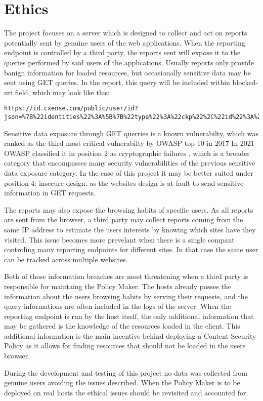 \section{Ethics}
The project focuses on a server which is designed to collect and act on reports potentially sent by genuine users of the web applications. 
When the reporting endpoint is controlled by a third party, the reports sent will expose it to the queries performed by said users of the applications.
Usually reports only provide banign information for loaded resources, but occasionally sensitive data may be sent using GET queries.
In the report, this query will be included within blocked-uri field, which may look like this:
\begin{verbatim}
https://id.cxense.com/public/user/id?json=%7B%22identities%22%3A%5B%7B%22type%22%3A%22ckp%22%2C%22id%22%3A%22lm9kdx9144wtgfya%22%7D%2C%7B%22type%22%3A%22cst%22%2C%22id%22%3A%223dmijrrz7kkn62ie7ib1yw5z6l%22%7D%5D%2C%22siteId%22%3A%221136227972865927410%22%2C%22location%22%3A%22https%3A%2F%2Fwww.libertatea.ro%2F%22%7D&callback=cXJsonpCB2
\end{verbatim}
Sensitive data exposure through GET querries is a known vulnerabilty, which was ranked as the third most critical vulnerabilty by OWASP top 10 in 2017 \cite{owaspTop102017}
In 2021 OWASP classified it in position 2 as cryptographic failures \cite{owaspTop10}, which is a broader category that encompasses many security vulnerabilities of the previous sensitive data exposure category. 
In the case of this project it may be better suited under position 4: insecure design, as the websites design is at fault to send sensitive information in GET requests. 

The reports may also expose the browsing habits of specific users. 
As all reports are sent from the browser, a third party may collect reports coming from the same IP address to estimate the users interests by knowing which sites have they visited. 
This issue becomes more prevelant when there is a single compant controling many reporting endpoints for different sites.
In that case the same user can be tracked across multiple websites.

Both of those information breaches are most threatening when a third party is responsible for maintaing the Policy Maker.
The hosts already posses the information about the users browsing habits by serving their requests, and the query informations are often included in the logs of the server.
When the reporting endpoint is run by the host itself, the only additional information that may be gathered is the knowledge of the resources loaded in the client. 
This additional information is the main incentive behind deploying a Content Security Policy as it allows for finding resources that should not be loaded in the users browser.

During the development and testing of this project no data was collected from genuine users avoiding the issues described.
When the Policy Maker is to be deployed on real hosts the ethical issues should be revisited and accounted for.

